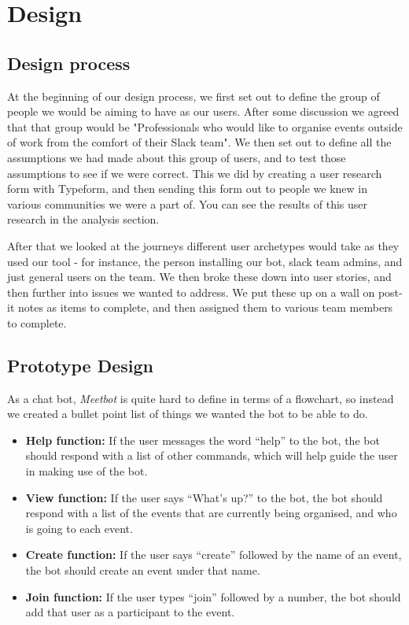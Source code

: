 \documentclass[12pt]{report}
\begin{document}
\chapter{Design}\label{design}
\section{Design process}

At the beginning of our design process, we first set out to define the group of people we would be aiming to have as our users. After some discussion we agreed that that group would be "Professionals who would like to organise events outside of work from the comfort of their Slack team". We then set out to define all the assumptions we had made about this group of users, and to test those assumptions to see if we were correct. This we did by creating a user research form with Typeform, and then sending this form out to people we knew in various communities we were a part of. You can see the results of this user research in the analysis section.

\vspace{3mm}

After that we looked at the journeys different user archetypes would take as they used our tool - for instance, the person installing our bot, slack team admins, and just general users on the team. We then broke these down into user stories, and then further into issues we wanted to address. We put these up on a wall on post-it notes as items to complete, and then assigned them to various team members to complete.

\section{Prototype Design}

As a chat bot, \emph{Meetbot} is quite hard to define in terms of a flowchart, so instead we created a bullet point list of things we wanted the bot to be able to do.

\begin{itemize}
	\item \textbf{Help function:} If the user messages the word ``help'' to the bot, the bot should respond with a list of other commands, which will help guide the user in making use of the bot.
	\item \textbf{View function:} If the user says ``What's up?'' to the bot, the bot should respond with a list of the events that are currently being organised, and who is going to each event.
	\item \textbf{Create function:} If the user says ``create'' followed by the name of an event, the bot should create an event under that name.
	\item \textbf{Join function:} If the user types ``join'' followed by a number, the bot should add that user as a participant to the event.
\end{itemize}
\end{document}
